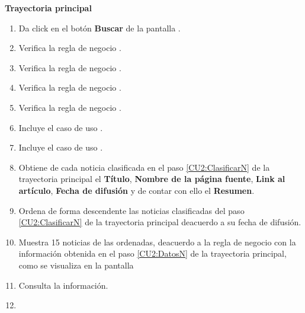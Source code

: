 \begin{large}
	\textbf{Trayectoria principal}\\
\end{large}	

\begin{enumerate}[1.]

	\item \actor \label{CU2:Buscar}Da click en el botón \textbf{Buscar} de la pantalla .  

	\item \sistema \label{CU2:CamposO}Verifica la regla de negocio . 

	\item \sistema Verifica la regla de negocio . 

	\item \sistema Verifica la regla de negocio . 

	\item \sistema Verifica la regla de negocio .  

	\item \sistema Incluye el caso de uso .

	\item \sistema \label{CU2:ClasificarN}Incluye el caso de uso .

	\item \sistema \label{CU2:DatosN}Obtiene de cada noticia clasificada en el paso \ref{CU2:ClasificarN} de la trayectoria principal el \textbf{Título}, \textbf{Nombre de la página fuente}, \textbf{Link al artículo}, \textbf{Fecha de difusión} y de contar con ello el \textbf{Resumen}.

	\item \sistema \label{CU2:OrdenaN}Ordena de forma descendente las noticias clasificadas del paso \ref{CU2:ClasificarN} de la trayectoria principal deacuerdo a su fecha de difusión.

	\item \sistema Muestra 15 noticias de las ordenadas, deacuerdo a la regla de negocio  con la información obtenida en el paso \ref{CU2:DatosN} de la trayectoria principal, como se visualiza en la pantalla  

	\item \actor \label{CU2:Consulta}Consulta la información.

	\item \finCU	
\end{enumerate}


